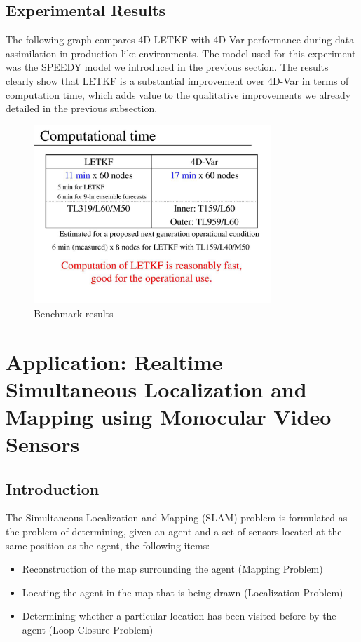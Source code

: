 \documentclass{article}
\begin{document}
\subsection{Experimental Results}

The following graph compares 4D-LETKF with 4D-Var performance during data assimilation in production-like environments. The model used for this experiment was the SPEEDY model we introduced in the previous section. The results clearly show that LETKF is a substantial improvement over 4D-Var in terms of computation time, which adds value to the qualitative improvements we already detailed in the previous subsection.

\begin{figure}[H]
\begin{center}
\includegraphics[width=0.8\textwidth]{letkf_vs_4dvar}
\caption{Benchmark results \cite{LETKFJMA}}
\end{center}
\end{figure}

\section{Application: Realtime Simultaneous Localization and Mapping using Monocular Video Sensors}

\subsection{Introduction}

The Simultaneous Localization and Mapping (SLAM) problem is formulated as the problem of determining, given an agent and a set of sensors located at the same position as the agent, the following items:

\begin{itemize}
\item Reconstruction of the map surrounding the agent (Mapping Problem)
\item Locating the agent in the map that is being drawn (Localization Problem)
\item Determining whether a particular location has been visited before by the agent (Loop Closure Problem)
\end{itemize}
\end{document}
